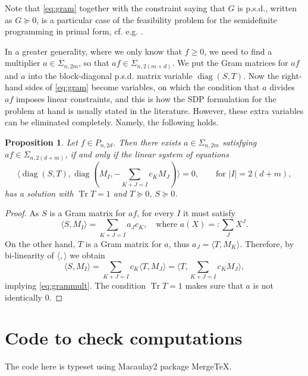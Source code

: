 \documentclass[a4paper,twoside,reqno]{amsart}
\DeclareMathOperator{\Tr}{Tr}
\DeclareMathOperator{\diag}{diag}
\newcommand{\PHF}[2]{P_{{#2},{#1}}}
\newcommand{\SosHF}[2]{\Sigma_{{#2},{#1}}}
\theoremstyle{plain}
\newtheorem{prop}{Proposition}%
\theoremstyle{definition}
\theoremstyle{remark}
\begin{document}
Note that \eqref{eq:gram} together with the constraint saying that $G$ is p.s.d., written as $G\succeq 0$,
is a particular case of the feasibility problem for the semidefinite programming in primal form, cf. e.g. \cite[Chapter~2]{MR3075433}.

In a greater generality, where we only know that $f\geq 0$, we need to find
a  multiplier $a\in\SosHF{2m}{n}$, so that 
$af\in\SosHF{2(m+d)}{n}$. We put the Gram matrices for $af$ and $a$  into the block-diagonal p.s.d.
matrix variable $\diag(S,T)$. Now the right-hand sides of \eqref{eq:gram} become variables,
on which the condition that $a$ divides $af$ imposes linear constraints, and this is how the SDP
formulation for the problem at hand is usually stated in the literature. However, these extra variables can be
eliminated completely. Namely, the following holds.
\begin{prop}
Let $f\in\PHF{2d}{n}$. Then there exists $a\in\SosHF{2m}{n}$ satisfying
$af\in\SosHF{2(d+m)}{n}$, if and only if the linear system of equations 
\begin{equation}\label{eq:grammult}
\langle \diag(S,T), \diag(M_I,-\sum_{K+J=I}c_K M_J)\rangle = 0,\qquad\text{for $|I|=2(d+m)$},
\end{equation}
has a solution with $\Tr T=1$ and $T\succeq 0$, $S\succeq 0$.
\end{prop}
\begin{proof}
As $S$ is a Gram matrix for $af$, for every $I$ it must satisfy
\begin{equation*}\label{eq:grameq}
\langle S,M_I\rangle = \sum_{K+J=I} a_J c_K,\quad\text{where $a(X)=:\sum_J X^J$.}
\end{equation*}
On the other hand, $T$ is a Gram matrix for $a$, thus $a_J=\langle T,M_K\rangle$.
Therefore, by bi-linearity of $\langle ,\rangle$ we obtain
\begin{equation*}
\langle S,M_I\rangle = \sum_{K+J=I} c_K \langle T, M_J\rangle=\langle T,\sum_{K+J=I} c_K  M_J\rangle,
\end{equation*}
implying \eqref{eq:grammult}. The condition $\Tr T=1$ makes sure that $a$ is not identically 0.
\end{proof}

\clearpage

\section{Code to check computations}\label{app:code}
The code here is typeset using Macaulay2 package Merge\TeX \cite{MergeTeXSource}.
\end{document}
